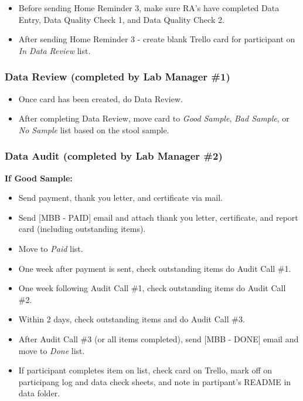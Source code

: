 \documentclass[]{book}
\providecommand{\tightlist}{%
  \setlength{\itemsep}{0pt}\setlength{\parskip}{0pt}}
\begin{document}
\begin{itemize}
\tightlist
\item
  Before sending Home Reminder 3, make sure RA's have completed Data Entry, Data Quality Check 1, and Data Quality Check 2.
\item
  After sending Home Reminder 3 - create blank Trello card for participant on \emph{In Data Review} list.
\end{itemize}

\hypertarget{data-review-completed-by-lab-manager-1}{%
\subsubsection{Data Review (completed by Lab Manager \#1)}\label{data-review-completed-by-lab-manager-1}}

\begin{itemize}
\tightlist
\item
  Once card has been created, do Data Review.
\item
  After completing Data Review, move card to \emph{Good Sample}, \emph{Bad Sample}, or \emph{No Sample} list based on the stool sample.
\end{itemize}

\hypertarget{data-audit-completed-by-lab-manager-2}{%
\subsubsection{Data Audit (completed by Lab Manager \#2)}\label{data-audit-completed-by-lab-manager-2}}

\textbf{If Good Sample:}

\begin{itemize}
\tightlist
\item
  Send payment, thank you letter, and certificate via mail.
\item
  Send {[}MBB - PAID{]} email and attach thank you letter, certificate, and report card (including outstanding items).
\item
  Move to \emph{Paid} list.
\item
  One week after payment is sent, check outstanding items do Audit Call \#1.
\item
  One week following Audit Call \#1, check outstanding items do Audit Call \#2.
\item
  Within 2 days, check outstanding items and do Audit Call \#3.
\item
  After Audit Call \#3 (or all items completed), send {[}MBB - DONE{]} email and move to \emph{Done} list.
\item
  If participant completes item on list, check card on Trello, mark off on participang log and data check sheets, and note in partipant's README in data folder.
\end{itemize}
\end{document}
